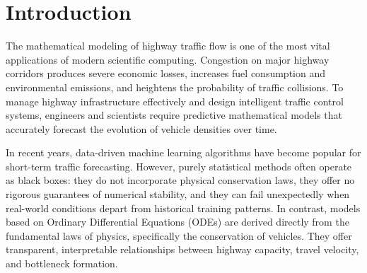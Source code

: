 \documentclass[runningheads]{llncs}
\begin{document}
\section{Introduction}
\label{sec:intro}
The mathematical modeling of highway traffic flow is one of the most vital applications of modern scientific computing. Congestion on major highway corridors produces severe economic losses, increases fuel consumption and environmental emissions, and heightens the probability of traffic collisions. To manage highway infrastructure effectively and design intelligent traffic control systems, engineers and scientists require predictive mathematical models that accurately forecast the evolution of vehicle densities over time.

In recent years, data-driven machine learning algorithms have become popular for short-term traffic forecasting. However, purely statistical methods often operate as black boxes: they do not incorporate physical conservation laws, they offer no rigorous guarantees of numerical stability, and they can fail unexpectedly when real-world conditions depart from historical training patterns. In contrast, models based on Ordinary Differential Equations (ODEs) are derived directly from the fundamental laws of physics, specifically the conservation of vehicles. They offer transparent, interpretable relationships between highway capacity, travel velocity, and bottleneck formation.
\end{document}
